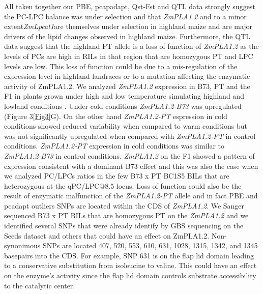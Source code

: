\documentclass[9pt,twocolumn,twoside,lineno]{gsajnl}
\begin{document}
All taken together our PBE, pcapadapt, Qst-Fst and QTL data strongly suggest the PC-LPC balance was under selection and that \textit{ZmPLA1.2} and to a minor extent\textit{ZmLpcat1}are themselves under selection in highland maize and are major drivers of the lipid changes observed in highland maize. 
Furthermore, the QTL data suggest that the highland PT allele is a loss of function of \textit{ZmPLA1.2} as the levels of PCs are high in RILs in that region that are homozygous PT and LPC levels are low. 
This loss of function could be due to a mis-regulation of the expression level in highland landraces or to a mutation affecting the enzymatic activity of ZmPLA1.2. 
We analyzed \textit{ZmPLA1.2} expression in B73, PT and the F1 in plants grown under high and low temperature simulating highland and lowland conditions \cite{Crow2020-gene}. 
Under cold conditions \textit{ZmPLA1.2-B73} was upregulated (Figure 3\ref{Fig3}G). 
On the other hand \textit{ZmPLA1.2-PT} espression in cold conditions showed reduced variability when compared to warm conditions but was not significantly upregulated when compared with \textit{ZmPLA1.2-PT} in control conditions.
\textit{ZmPLA1.2-PT} expression in cold conditions was similar to \textit{ZmPLA1.2-B73} in control conditions.
\textit{ZmPLA1.2} on the F1 showed a pattern of expression consistent with a dominant B73 effect and this was also the case when we analyzed PC/LPCs ratios in the few B73 x PT BC1S5 BILs that are heterozygous at the qPC/LPC@8.5 locus. 
Loss of function could also be the result of enzymatic malfunction of the \textit{ZmPLA1.2-PT} allele and in fact PBE and pcadapt outliers SNPs are located within the CDS of \textit{ZmPLA1.2}. 
We Sanger sequenced B73 x PT BILs that are homozygous PT on the \textit{ZmPLA1.2} and we identified several SNPs that were already identify by GBS sequencing on the Seeds dataset and others that could have an effect on ZmPLA1.2. Non-synonimous SNPs are located 407, 520, 553, 610, 631, 1028, 1315, 1342, and 1345 basepairs into the CDS.
For example, SNP 631 is on the flap lid domain leading to a conservative substitution from isoleucine to valine. This could have an effect on the enzyme's activity since the flap lid domain controls substrate accessibility to the catalytic center. 
\end{document}
